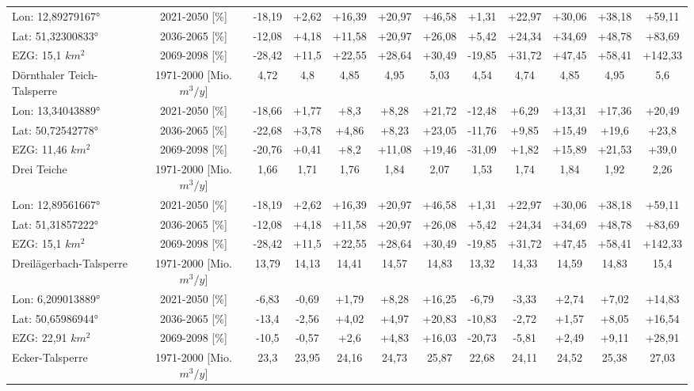 \begin{longtable}{@{\extracolsep{\fill}}lc|ccccc||ccccc}
\cline{2-12} 
Lon: 12,89279167° & 2021-2050 [\%]  & -18,19 & +2,62 & +16,39 & +20,97 & +46,58 & +1,31 & +22,97 & +30,06 & +38,18 & +59,11\\ 
Lat: 51,32300833° & 2036-2065 [\%]  & -12,08 & +4,18 & +11,58 & +20,97 & +26,08 & +5,42 & +24,34 & +34,69 & +48,78 & +83,69\\ 
EZG: 15,1 $km^2$ & 2069-2098 [\%]  & -28,42 & +11,5 & +22,55 & +28,64 & +30,49 & -19,85 & +31,72 & +47,45 & +58,41 & +142,33\\ 
\hline 
Dörnthaler Teich-Talsperre & 1971-2000 [Mio. $m^3/y$]  & 4,72 & 4,8 & 4,85 & 4,95 & 5,03 & 4,54 & 4,74 & 4,85 & 4,95 & 5,6\\ 
\cline{2-12} 
Lon: 13,34043889° & 2021-2050 [\%]  & -18,66 & +1,77 & +8,3 & +8,28 & +21,72 & -12,48 & +6,29 & +13,31 & +17,36 & +20,49\\ 
Lat: 50,72542778° & 2036-2065 [\%]  & -22,68 & +3,78 & +4,86 & +8,23 & +23,05 & -11,76 & +9,85 & +15,49 & +19,6 & +23,8\\ 
EZG: 11,46 $km^2$ & 2069-2098 [\%]  & -20,76 & +0,41 & +8,2 & +11,08 & +19,46 & -31,09 & +1,82 & +15,89 & +21,53 & +39,0\\ 
\hline 
Drei Teiche & 1971-2000 [Mio. $m^3/y$]  & 1,66 & 1,71 & 1,76 & 1,84 & 2,07 & 1,53 & 1,74 & 1,84 & 1,92 & 2,26\\ 
\cline{2-12} 
Lon: 12,89561667° & 2021-2050 [\%]  & -18,19 & +2,62 & +16,39 & +20,97 & +46,58 & +1,31 & +22,97 & +30,06 & +38,18 & +59,11\\ 
Lat: 51,31857222° & 2036-2065 [\%]  & -12,08 & +4,18 & +11,58 & +20,97 & +26,08 & +5,42 & +24,34 & +34,69 & +48,78 & +83,69\\ 
EZG: 15,1 $km^2$ & 2069-2098 [\%]  & -28,42 & +11,5 & +22,55 & +28,64 & +30,49 & -19,85 & +31,72 & +47,45 & +58,41 & +142,33\\ 
\hline 
Dreilägerbach-Talsperre & 1971-2000 [Mio. $m^3/y$]  & 13,79 & 14,13 & 14,41 & 14,57 & 14,83 & 13,32 & 14,33 & 14,59 & 14,83 & 15,4\\ 
\cline{2-12} 
Lon: 6,209013889° & 2021-2050 [\%]  & -6,83 & -0,69 & +1,79 & +8,28 & +16,25 & -6,79 & -3,33 & +2,74 & +7,02 & +14,83\\ 
Lat: 50,65986944° & 2036-2065 [\%]  & -13,4 & -2,56 & +4,02 & +4,97 & +20,83 & -10,83 & -2,72 & +1,57 & +8,05 & +16,54\\ 
EZG: 22,91 $km^2$ & 2069-2098 [\%]  & -10,5 & -0,57 & +2,6 & +4,83 & +16,03 & -20,73 & -5,81 & +2,49 & +9,11 & +28,91\\ 
\hline 
Ecker-Talsperre & 1971-2000 [Mio. $m^3/y$]  & 23,3 & 23,95 & 24,16 & 24,73 & 25,87 & 22,68 & 24,11 & 24,52 & 25,38 & 27,03\\ 

\end{longtable}

